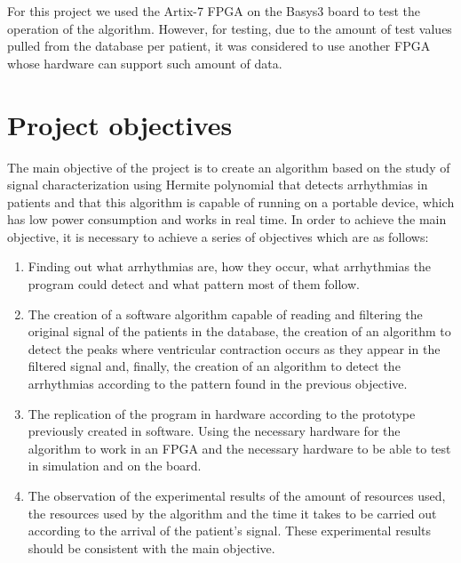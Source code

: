 For this project we used the Artix-7 FPGA \cite{xilinx_artix7} on the Basys3 board to test the operation of the algorithm. However, for testing, due to the amount of test values pulled from the database per patient, it was considered to use another FPGA whose hardware can support such amount of data.


\section*{Project objectives}

The main objective of the project is to create an algorithm based on the study of signal characterization using Hermite polynomial \cite{desai2021low} that detects arrhythmias in patients and that this algorithm is capable of running on a portable device, which has low power consumption and works in real time. In order to achieve the main objective, it is necessary to achieve a series of objectives which are as follows:

\begin{enumerate}
    \item Finding out what arrhythmias are, how they occur, what arrhythmias the program could detect and what pattern most of them follow.
    \item The creation of a software algorithm capable of reading and filtering the original signal of the patients in the database, the creation of an algorithm to detect the peaks where ventricular contraction occurs as they appear in the filtered signal and, finally, the creation of an algorithm to detect the arrhythmias according to the pattern found in the previous objective.
    \item The replication of the program in hardware according to the prototype previously created in software. Using the necessary hardware for the algorithm to work in an FPGA and the necessary hardware to be able to test in simulation and on the board.
    \item The observation of the experimental results of the amount of resources used, the resources used by the algorithm and the time it takes to be carried out according to the arrival of the patient's signal. These experimental results should be consistent with the main objective.
\end{enumerate}


